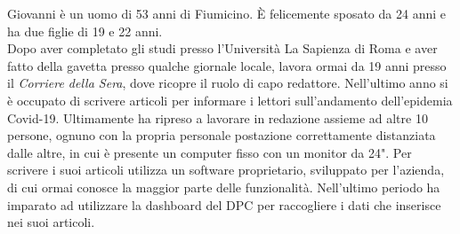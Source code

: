 
Giovanni è un uomo di 53 anni di Fiumicino. È felicemente sposato da 24 anni e ha due figlie di 19 e 22 anni.\\ 
Dopo aver completato gli studi presso l'Università La Sapienza di Roma e aver fatto della gavetta presso qualche giornale locale, lavora ormai da 19 anni presso il \textit{Corriere della Sera}, dove ricopre il ruolo di capo redattore. Nell'ultimo anno si è occupato di scrivere articoli per informare i lettori sull'andamento dell'epidemia Covid-19. Ultimamente ha ripreso a lavorare in redazione assieme ad altre 10 persone, ognuno con la propria personale postazione correttamente distanziata dalle altre, in cui è presente un computer fisso con un monitor da 24".
Per scrivere i suoi articoli utilizza un software proprietario, sviluppato per l'azienda, di cui ormai conosce la maggior parte delle funzionalità. Nell'ultimo periodo ha imparato ad utilizzare la dashboard del DPC per raccogliere i dati che inserisce nei suoi articoli.

